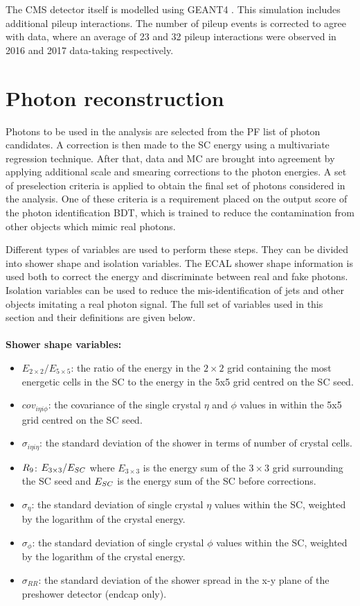 The CMS detector itself is modelled using \textsc{GEANT4} \cite{Geant4}.
This simulation includes additional pileup interactions.
The number of pileup events is corrected to agree with data, 
where an average of 23 and 32 pileup interactions were observed in 2016 and 2017 data-taking respectively.

\section{Photon reconstruction}

Photons to be used in the \Hgg analysis are selected from the PF list of photon candidates.
A correction is then made to the SC energy using a multivariate regression technique.
After that, data and MC are brought into agreement by applying additional scale and smearing corrections to the photon energies.
A set of preselection criteria is applied to obtain the final set of photons considered in the analysis.
One of these criteria is a requirement placed on the output score of the photon identification BDT, 
which is trained to reduce the contamination from other objects which mimic real photons.

Different types of variables are used to perform these steps.
They can be divided into shower shape and isolation variables.
The ECAL shower shape information is used both to correct the energy and discriminate between real and fake photons.
Isolation variables can be used to reduce the mis-identification of jets and other objects imitating a real photon signal.
The full set of variables used in this section and their definitions are given below.
\\ \\
\textbf{Shower shape variables:}
\begin{itemize}[noitemsep]
  \item \emph{$E_{2\times2}/E_{5\times5}$}: the ratio of the energy in the $2\times2$ grid
    containing the most energetic cells in the SC to the energy in
    the 5x5 grid centred on the SC seed.
  \item \emph{$cov_{i\eta i\phi}$}: the covariance of the single crystal $\eta$
    and $\phi$ values in within the 5x5 grid centred on the
    SC seed.
  \item \emph{$\sigma_{i\eta i\eta}$}: the standard deviation of the 
    shower in terms of number of crystal cells. 
  \item \emph{$R_9$}: $E_{3\times3}/E_{SC}$ where $E_{3\times3}$ is the energy sum of the
    $3\times3$ grid surrounding the SC seed and $E_{SC}$ is the energy sum of the SC before corrections. 
  \item \emph{$\sigma_{\eta}$}: the standard deviation
    of single crystal $\eta$ values within the SC, weighted by the logarithm of the crystal energy.
  \item \emph{$\sigma_{\phi}$}: the standard deviation
    of single crystal $\phi$ values within the SC, weighted by the logarithm of the crystal energy.
  \item \emph{$\sigma_{RR}$}: the standard deviation of the shower
    spread in the x-y plane of the preshower detector (endcap only).
\end{itemize}

